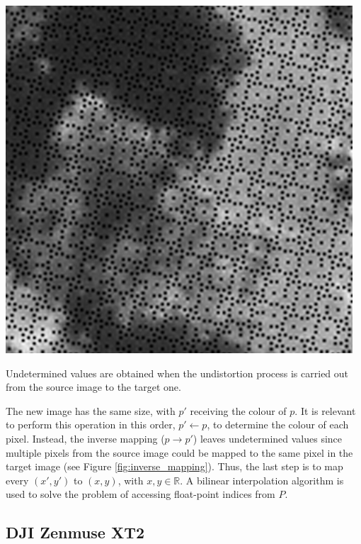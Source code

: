\begin{marginfigure}[-1.5cm]
	\includegraphics{figs/materials/inverse_mapping.png}
	\caption{Undetermined values are obtained when the undistortion process is carried out from the source image to the target one.}
	\label{fig:inverse_mapping}
\end{marginfigure}
The new image has the same size, with $p'$ receiving the colour of $p$. It is relevant to perform this operation in this order, $p' \gets p$, to determine the colour of each pixel. Instead, the inverse mapping ($p \rightarrow p'$) leaves undetermined values since multiple pixels from the source image could be mapped to the same pixel in the target image (see Figure \ref{fig:inverse_mapping}). Thus, the last step is to map every $(x', y')$ to $(x, y)$, with $x, y \in \mathbb{R}$. A bilinear interpolation algorithm is used to solve the problem of accessing float-point indices from $P$.

\subsection{DJI Zenmuse XT2}

